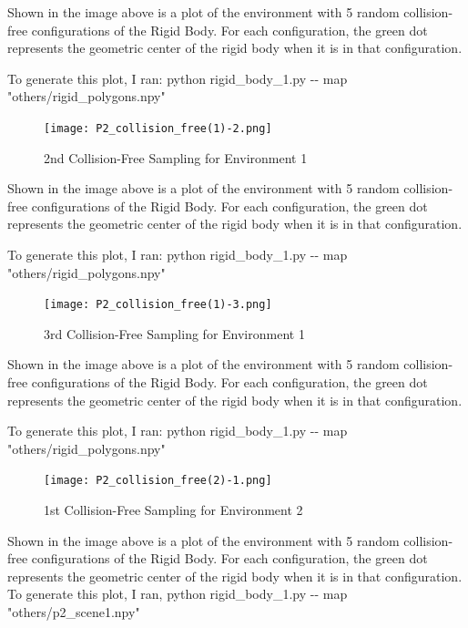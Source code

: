 \documentclass{article}
\begin{document}
Shown in the image above is a plot of the environment with 5 random collision-free configurations of the Rigid Body. For each configuration, the green dot represents the geometric center of the rigid body when it is in that configuration. \newline 

To generate this plot, I ran: \newline 
python rigid\_body\_1.py -\-- map "others/rigid\_polygons.npy"


\newpage 
\begin{figure}[h!]
	\texttt{[image: P2\_collision\_free(1)-2.png]}
	\centering
	\caption{2nd Collision-Free Sampling for Environment 1}
	\label{P2_collision_free(1)-2.png}
\end{figure}
Shown in the image above is a plot of the environment with 5 random collision-free configurations of the Rigid Body. For each configuration, the green dot represents the geometric center of the rigid body when it is in that configuration. \newline 

To generate this plot, I ran: \newline 
python rigid\_body\_1.py -\-- map "others/rigid\_polygons.npy"


\newpage 
\begin{figure}[h!]
	\texttt{[image: P2\_collision\_free(1)-3.png]}
	\centering
	\caption{3rd Collision-Free Sampling for Environment 1}
	\label{P2_collision_free(1)-3.png}
\end{figure}
Shown in the image above is a plot of the environment with 5 random collision-free configurations of the Rigid Body. For each configuration, the green dot represents the geometric center of the rigid body when it is in that configuration. 

To generate this plot, I ran: \newline 
python rigid\_body\_1.py -\-- map "others/rigid\_polygons.npy"


\newpage 
\begin{figure}[h!]
	\texttt{[image: P2\_collision\_free(2)-1.png]}
	\centering
	\caption{1st Collision-Free Sampling for Environment 2}
	\label{P2_collision_free(2)-1.png}
\end{figure}
Shown in the image above is a plot of the environment with 5 random collision-free configurations of the Rigid Body. For each configuration, the green dot represents the geometric center of the rigid body when it is in that configuration. To generate this plot, I ran, python rigid\_body\_1.py -\-- map "others/p2\_scene1.npy"
\end{document}
